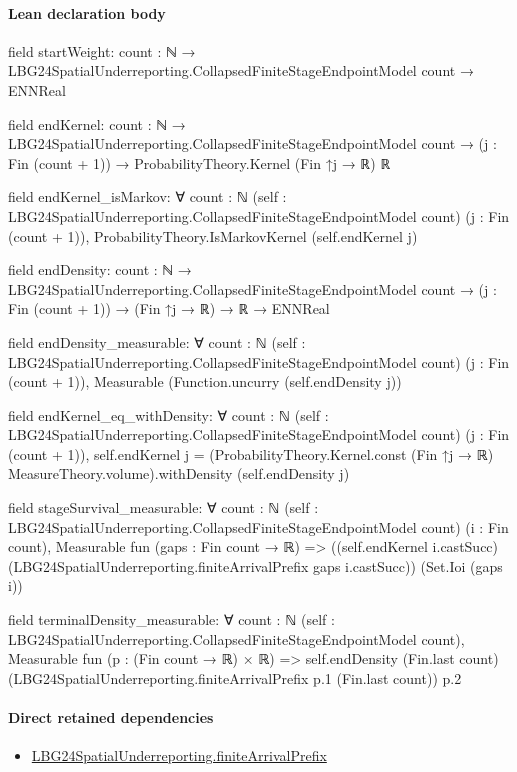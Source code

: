 \documentclass[10pt]{article}
\begin{document}
\paragraph{Lean declaration body}
\begin{ReviewVerbatim}
field startWeight:
{count : ℕ} → LBG24SpatialUnderreporting.CollapsedFiniteStageEndpointModel count → ENNReal

field endKernel:
{count : ℕ} →
  LBG24SpatialUnderreporting.CollapsedFiniteStageEndpointModel count →
    (j : Fin (count + 1)) → ProbabilityTheory.Kernel (Fin ↑j → ℝ) ℝ

field endKernel_isMarkov:
∀ {count : ℕ} (self : LBG24SpatialUnderreporting.CollapsedFiniteStageEndpointModel count) (j : Fin (count + 1)),
  ProbabilityTheory.IsMarkovKernel (self.endKernel j)

field endDensity:
{count : ℕ} →
  LBG24SpatialUnderreporting.CollapsedFiniteStageEndpointModel count →
    (j : Fin (count + 1)) → (Fin ↑j → ℝ) → ℝ → ENNReal

field endDensity_measurable:
∀ {count : ℕ} (self : LBG24SpatialUnderreporting.CollapsedFiniteStageEndpointModel count) (j : Fin (count + 1)),
  Measurable (Function.uncurry (self.endDensity j))

field endKernel_eq_withDensity:
∀ {count : ℕ} (self : LBG24SpatialUnderreporting.CollapsedFiniteStageEndpointModel count) (j : Fin (count + 1)),
  self.endKernel j = (ProbabilityTheory.Kernel.const (Fin ↑j → ℝ) MeasureTheory.volume).withDensity (self.endDensity j)

field stageSurvival_measurable:
∀ {count : ℕ} (self : LBG24SpatialUnderreporting.CollapsedFiniteStageEndpointModel count) (i : Fin count),
  Measurable fun (gaps : Fin count → ℝ) =>
    ((self.endKernel i.castSucc) (LBG24SpatialUnderreporting.finiteArrivalPrefix gaps i.castSucc)) (Set.Ioi (gaps i))

field terminalDensity_measurable:
∀ {count : ℕ} (self : LBG24SpatialUnderreporting.CollapsedFiniteStageEndpointModel count),
  Measurable fun (p : (Fin count → ℝ) × ℝ) =>
    self.endDensity (Fin.last count) (LBG24SpatialUnderreporting.finiteArrivalPrefix p.1 (Fin.last count)) p.2
\end{ReviewVerbatim}

\paragraph{Direct retained dependencies}
\begin{itemize}\raggedright
\item \hyperlink{governing-declaration-29c2f9ef07a8b8ce}{LBG24\allowbreak{}Spatial\allowbreak{}Underreporting.\allowbreak{}finite\allowbreak{}Arrival\allowbreak{}Prefix}
\end{itemize}
\hypertarget{governing-declaration-d08c9110d52e9643}{}
\end{document}
